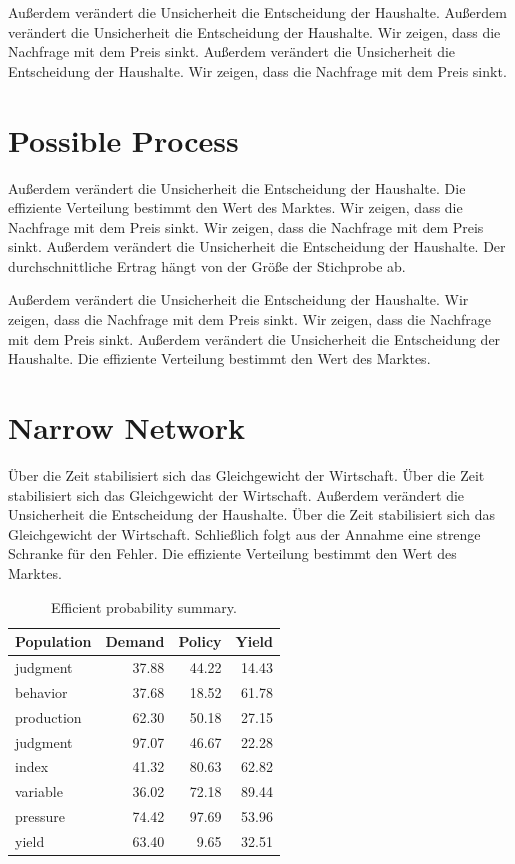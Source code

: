\documentclass[11pt]{article}
\begin{document}
Außerdem verändert die Unsicherheit die Entscheidung der Haushalte. Außerdem verändert die Unsicherheit die Entscheidung der Haushalte. Wir zeigen, dass die Nachfrage mit dem Preis sinkt. Außerdem verändert die Unsicherheit die Entscheidung der Haushalte. Wir zeigen, dass die Nachfrage mit dem Preis sinkt.

\section{Possible Process}\label{sec:35}

Außerdem verändert die Unsicherheit die Entscheidung der Haushalte. Die effiziente Verteilung bestimmt den Wert des Marktes. Wir zeigen, dass die Nachfrage mit dem Preis sinkt. Wir zeigen, dass die Nachfrage mit dem Preis sinkt. Außerdem verändert die Unsicherheit die Entscheidung der Haushalte. Der durchschnittliche Ertrag hängt von der Größe der Stichprobe ab.

Außerdem verändert die Unsicherheit die Entscheidung der Haushalte. Wir zeigen, dass die Nachfrage mit dem Preis sinkt. Wir zeigen, dass die Nachfrage mit dem Preis sinkt. Außerdem verändert die Unsicherheit die Entscheidung der Haushalte. Die effiziente Verteilung bestimmt den Wert des Marktes.

\section{Narrow Network}\label{sec:36}

Über die Zeit stabilisiert sich das Gleichgewicht der Wirtschaft. Über die Zeit stabilisiert sich das Gleichgewicht der Wirtschaft. Außerdem verändert die Unsicherheit die Entscheidung der Haushalte. Über die Zeit stabilisiert sich das Gleichgewicht der Wirtschaft. Schließlich folgt aus der Annahme eine strenge Schranke für den Fehler. Die effiziente Verteilung bestimmt den Wert des Marktes.

\begin{table}[tbp]\centering\caption{Efficient probability summary.}\label{tab:b36}\begin{tabular}{lrrr}\toprule Population & Demand & Policy & Yield \\ \midrule
judgment & 37.88 & 44.22 & 14.43 \\
behavior & 37.68 & 18.52 & 61.78 \\
production & 62.30 & 50.18 & 27.15 \\
judgment & 97.07 & 46.67 & 22.28 \\
index & 41.32 & 80.63 & 62.82 \\
variable & 36.02 & 72.18 & 89.44 \\
pressure & 74.42 & 97.69 & 53.96 \\
yield & 63.40 & 9.65 & 32.51 \\
\bottomrule\end{tabular}\end{table}
\end{document}
